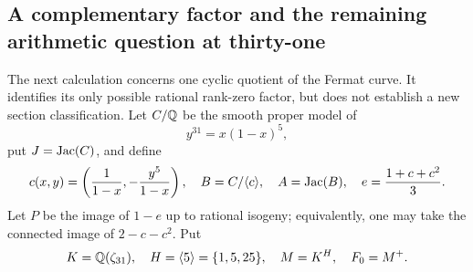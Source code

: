 \subsection{A complementary factor and the remaining arithmetic question at thirty-one}
\label{subsec:thirtyone-gate}

The next calculation concerns one cyclic quotient of the Fermat curve.
It identifies its only possible rational rank-zero factor, but does not
establish a new section classification. Let $C/\mathbb Q$ be the smooth proper
model of
\[
 y^{31}=x(1-x)^5,
\]
put $J=\operatorname{Jac}(C)$, and define
\[
 c(x,y)=\left(\frac1{1-x},-\frac{y^5}{1-x}\right),\quad
 B=C/\langle c\rangle,\quad A=\operatorname{Jac}(B),\quad
 e=\frac{1+c+c^2}{3}.
\]
Let $P$ be the image of $1-e$ up to rational isogeny; equivalently,
one may take the connected image of $2-c-c^2$. Put
\[
 K=\mathbb Q(\zeta_{31}),\quad H=\langle5\rangle=\{1,5,25\},\quad
 M=K^H,\quad F_0=M^+.
\]

